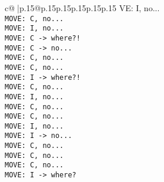 \documentclass{article}
\begin{document}
{\begin{supertabular}{c@{$\;$}|p{.15\linewidth}@{}p{.15\linewidth}p{.15\linewidth}p{.15\linewidth}p{.15\linewidth}p{.15\linewidth}}
{{{VE: I, no...\\ \tt  MOVE: C, no...\\ \tt  MOVE: I, no...\\ \tt  MOVE: C -> where?!\\ \tt  MOVE: C -> no...\\ \tt  MOVE: C, no...\\ \tt  MOVE: C, no...\\ \tt  MOVE: I -> where?!\\ \tt  MOVE: C, no...\\ \tt  MOVE: I, no...\\ \tt  MOVE: C, no...\\ \tt  MOVE: C, no...\\ \tt  MOVE: I, no...\\ \tt  MOVE: I -> no...\\ \tt  MOVE: C, no...\\ \tt  MOVE: C, no...\\ \tt  MOVE: C, no...\\ \tt  MOVE: I -> where?}}}
\end{supertabular}}
\end{document}
